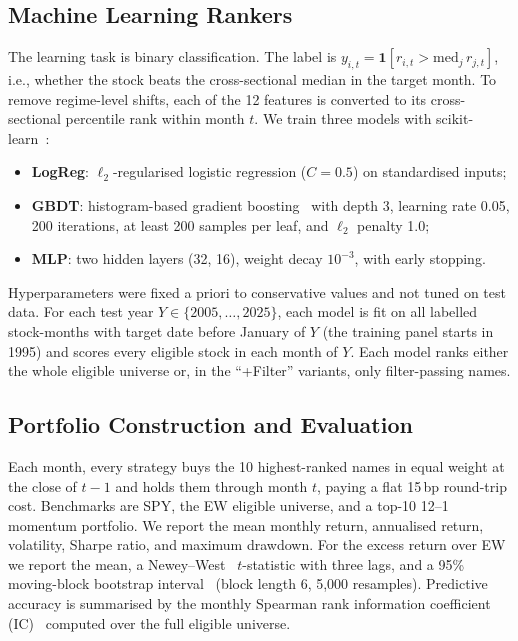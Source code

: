 \documentclass[conference]{IEEEtran}
\begin{document}
\subsection{Machine Learning Rankers}
The learning task is binary classification. The label is $y_{i,t}=\mathbf{1}[r_{i,t} > \mathrm{med}_j\, r_{j,t}]$, i.e., whether the stock beats the cross-sectional median in the target month. To remove regime-level shifts, each of the 12 features is converted to its cross-sectional percentile rank within month $t$. We train three models with scikit-learn~\cite{pedregosa2011}:
\begin{itemize}
\item \textbf{LogReg}: $\ell_2$-regularised logistic regression ($C=0.5$) on standardised inputs;
\item \textbf{GBDT}: histogram-based gradient boosting~\cite{friedman2001,ke2017} with depth 3, learning rate 0.05, 200 iterations, at least 200 samples per leaf, and $\ell_2$ penalty 1.0;
\item \textbf{MLP}: two hidden layers (32, 16), weight decay $10^{-3}$, with early stopping.
\end{itemize}
Hyperparameters were fixed a priori to conservative values and not tuned on test data. For each test year $Y\in\{2005,\dots,2025\}$, each model is fit on all labelled stock-months with target date before January of $Y$ (the training panel starts in 1995) and scores every eligible stock in each month of $Y$. Each model ranks either the whole eligible universe or, in the ``+Filter'' variants, only filter-passing names.

\subsection{Portfolio Construction and Evaluation}
Each month, every strategy buys the 10 highest-ranked names in equal weight at the close of $t-1$ and holds them through month $t$, paying a flat 15\,bp round-trip cost. Benchmarks are SPY, the EW eligible universe, and a top-10 12--1 momentum portfolio. We report the mean monthly return, annualised return, volatility, Sharpe ratio, and maximum drawdown. For the excess return over EW we report the mean, a Newey--West~\cite{newey1987} $t$-statistic with three lags, and a 95\% moving-block bootstrap interval~\cite{kunsch1989} (block length 6, 5{,}000 resamples). Predictive accuracy is summarised by the monthly Spearman rank information coefficient (IC)~\cite{grinold2000} computed over the full eligible universe.
\end{document}
